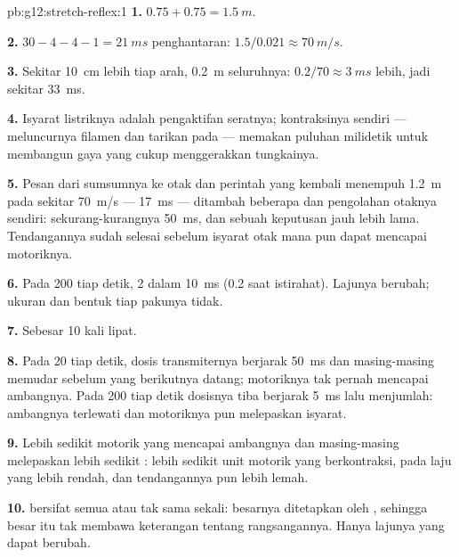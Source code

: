\begin{solution}{pb:g12:stretch-reflex:1}
\textbf{1.} $0.75 + 0.75 = \qty{1.5}{m}$.

\textbf{2.} $30 - 4 - 4 - 1 = \qty{21}{ms}$ penghantaran: $1.5/0.021
\approx \qty{70}{m/s}$.

\textbf{3.} Sekitar \qty{10}{cm} lebih tiap arah, \qty{0.2}{m}
seluruhnya: $0.2/70 \approx \qty{3}{ms}$ lebih, jadi sekitar \qty{33}{ms}.

\textbf{4.} Isyarat listriknya adalah pengaktifan seratnya;
kontraksinya sendiri --- meluncurnya filamen dan tarikan pada
 --- memakan puluhan milidetik untuk membangun gaya yang cukup
menggerakkan tungkainya.

\textbf{5.} Pesan dari sumsumnya ke otak dan perintah yang kembali
menempuh \qty{1.2}{m} pada sekitar \qty{70}{m/s} --- \qty{17}{ms} ---
ditambah beberapa  dan pengolahan otaknya sendiri:
sekurang-kurangnya \qty{50}{ms}, dan sebuah keputusan jauh lebih lama.
Tendangannya sudah selesai sebelum isyarat otak mana pun dapat mencapai
 motoriknya.

\textbf{6.} Pada 200 tiap detik, 2  dalam \qty{10}{ms}
(0.2 saat istirahat). Lajunya berubah; ukuran dan bentuk tiap pakunya
tidak.

\textbf{7.} Sebesar 10 kali lipat.

\textbf{8.} Pada 20 tiap detik, dosis transmiternya berjarak
\qty{50}{ms} dan masing-masing memudar sebelum yang berikutnya datang;
 motoriknya tak pernah mencapai ambangnya. Pada 200 tiap detik
dosisnya tiba berjarak \qty{5}{ms} lalu menjumlah: ambangnya terlewati
dan  motoriknya pun melepaskan isyarat.

\textbf{9.} Lebih sedikit  motorik yang mencapai ambangnya dan
masing-masing melepaskan lebih sedikit : lebih sedikit
unit motorik yang berkontraksi, pada laju yang lebih rendah, dan
tendangannya pun lebih lemah.

\textbf{10.}  bersifat semua atau tak sama sekali:
besarnya ditetapkan oleh , sehingga besar itu tak membawa
keterangan tentang rangsangannya. Hanya lajunya yang dapat berubah.


\end{solution}
